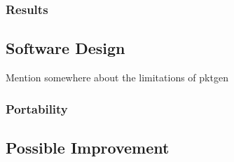 \documentclass[final_report.tex]{subfiles}
\begin{document}
\subsubsection{Results}

\subsection{Software Design}
Mention somewhere about the limitations of pktgen

\subsubsection{Portability}

\subsection{Possible Improvement}
\end{document}

